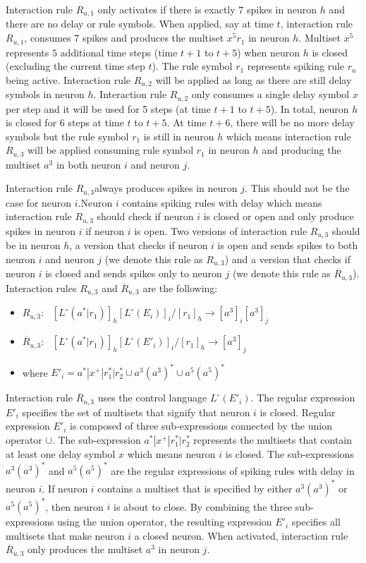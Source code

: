 \documentclass[a4paper]{article}
\theoremstyle{definition}
\newcommand{\ra}{\rightarrow}
\newcommand{\ts}{\text{ }}
\begin{document}
Interaction rule $R_{u,1}$ only activates if there is exactly $7$ spikes in neuron $h$ and there
are no delay or rule symbols. When applied, say at time $t$, interaction rule $R_{u,1}$, consumes 
$7$ spikes and produces the multiset $x^5r_1$ in neuron $h$. Multiset $x^5$ represents $5$ 
additional time steps (time $t+1$ to $t+5$) when neuron $h$ is closed (excluding the current time 
step $t$). The rule symbol $r_1$ represents spiking rule $r_u$ being active. Interaction rule 
$R_{u,2}$  will be applied as long as there are still delay symbols in neuron $h$. Interaction rule 
$R_{u,2}$ only consumes a single delay symbol $x$ per step and it will be used for 5 steps (at time 
$t+1$ to $t+5$). In total, neuron $h$ is closed for 6 steps at time $t$ to $t+5$. At time $t+6$, 
there will be no more delay symbols but the rule symbol $r_1$ is still in neuron $h$ which means 
interaction rule $R_{u,3}$ will be applied consuming rule symbol $r_1$ in neuron $h$ and producing 
the multiset $a^3$ in both neuron $i$ and neuron $j$.

Interaction rule $R_{u,3} $always produces spikes in neuron $j$. This should not be the case for
neuron $i$.Neuron $i$ contains spiking rules with delay which means interaction rule $R_{u,3}$ 
should check if neuron $i$ is closed or open and only produce spikes in neuron $i$ if neuron $i$ is
open. Two versions of interaction rule $R_{u,3}$ should be in neuron $h$, a version that checks if 
neuron $i$ is open and sends spikes to both neuron $i$ and neuron $j$ (we denote this rule as 
$R_{u,3}$) and a version that checks if neuron $i$ is closed and sends spikes only to neuron $j$ 
(we denote this rule as $\overline{R}_{u,3}$). Interaction rules $R_{u,3}$ and $\overline{R}_{u,3}$ 
are the following:

\begin{itemize}
\item $R_{u,3}:\ts {[L^{\circ}(a^*|r_1)]}_h {[L^{\circ}(E_i)]}_i / {[r_1]}_h \ra {[a^3]}_{i}{[a^3]}_{j}$
\item $\overline{R}_{u,3}:\ts {[L^{\circ}(a^*|r_1)]}_h {[L^{\circ}(E'_i)]}_i/ {[r_1]}_h \ra {[a^3]}_{j}$
\item where $E'_i =  a^*| x^+ | r_1^* | r_2^* \cup a^3(a^3)^* \cup a^5(a^5)^*$
\end{itemize}

Interaction rule $\overline{R}_{u,3}$ uses the control language $L^{\circ}(E'_i)$. The regular 
expression $E'_i$ specifies the set of multisets that signify that neuron $i$ is closed. Regular 
expression $E'_i$ is composed of three sub-expressions connected by the union operator $\cup$. The
sub-expression $a^*|x^+|r_1^*|r_2^*$ represents the multisets that contain at least one delay symbol
$x$ which means neuron $i$ is closed. The sub-expressions $a^3(a^3)^*$ and $a^5(a^5)^*$ are the 
regular expressions of spiking rules with delay in neuron $i$. If neuron $i$ contains a multiset
that is specified by either $a^3(a^3)^*$ or $a^5(a^5)^*$, then neuron $i$ is about to close. By
combining the three sub-expressions using the union operator, the resulting expression $E'_i$ 
specifies all multisets that make neuron $i$ a closed neuron. When activated, interaction rule 
$\overline{R}_{u,3}$ only produces the multiset $a^3$ in neuron $j$.
\end{document}
